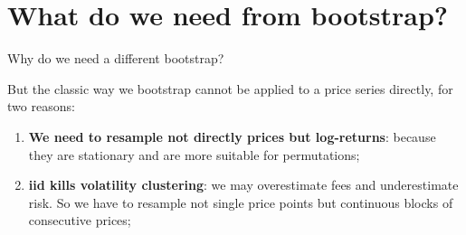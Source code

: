 \documentclass{beamer}          %
\begin{document}
\section{What do we need from bootstrap?}

\begin{frame}{Why do we need a different bootstrap?}

  \vspace{-1.5em}

  \begin{center}
  \end{center}

  \vspace{.5em}

  But the classic way we bootstrap cannot be applied to a price series directly, for two reasons:
  \begin{enumerate}
    \item \textbf{We need to resample not directly prices but log-returns}: because they are stationary and
      are more suitable for permutations;
    \item \textbf{\textmd{iid} kills volatility clustering}: we may overestimate fees and underestimate risk. So we have to resample not single
      price points but continuous blocks of consecutive prices;
  \end{enumerate}
\end{frame}
\end{document}
